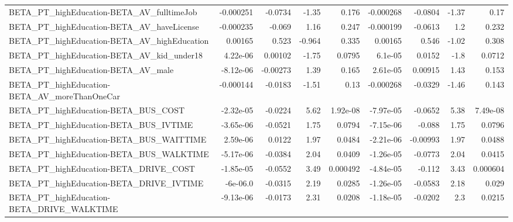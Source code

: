 \begin{tabular}{lrrrrrrrr}
BETA\_PT\_highEducation-BETA\_AV\_fulltimeJob          &   -0.000251 &      -0.0734 &     -1.35 &    0.176 &  -0.000268 &     -0.0804 &        -1.37 &          0.17 \\
BETA\_PT\_highEducation-BETA\_AV\_haveLicense          &   -0.000235 &       -0.069 &      1.16 &    0.247 &  -0.000199 &     -0.0613 &          1.2 &         0.232 \\
BETA\_PT\_highEducation-BETA\_AV\_highEducation        &     0.00165 &        0.523 &    -0.964 &    0.335 &    0.00165 &       0.546 &        -1.02 &         0.308 \\
BETA\_PT\_highEducation-BETA\_AV\_kid\_under18          &    4.22e-06 &      0.00102 &     -1.75 &   0.0795 &    6.1e-05 &      0.0152 &         -1.8 &        0.0712 \\
BETA\_PT\_highEducation-BETA\_AV\_male                 &   -8.12e-06 &     -0.00273 &      1.39 &    0.165 &   2.61e-05 &     0.00915 &         1.43 &         0.153 \\
BETA\_PT\_highEducation-BETA\_AV\_moreThanOneCar       &   -0.000144 &      -0.0183 &     -1.51 &     0.13 &  -0.000268 &     -0.0329 &        -1.46 &         0.143 \\
BETA\_PT\_highEducation-BETA\_BUS\_COST                &   -2.32e-05 &      -0.0224 &      5.62 & 1.92e-08 &  -7.97e-05 &     -0.0652 &         5.38 &      7.49e-08 \\
BETA\_PT\_highEducation-BETA\_BUS\_IVTIME              &   -3.65e-06 &      -0.0521 &      1.75 &   0.0794 &  -7.15e-06 &      -0.088 &         1.75 &        0.0796 \\
BETA\_PT\_highEducation-BETA\_BUS\_WAITTIME            &    2.59e-06 &       0.0122 &      1.97 &   0.0484 &  -2.21e-06 &    -0.00993 &         1.97 &        0.0488 \\
BETA\_PT\_highEducation-BETA\_BUS\_WALKTIME            &   -5.17e-06 &      -0.0384 &      2.04 &   0.0409 &  -1.26e-05 &     -0.0773 &         2.04 &        0.0415 \\
BETA\_PT\_highEducation-BETA\_DRIVE\_COST              &   -1.85e-05 &      -0.0552 &      3.49 & 0.000492 &  -4.84e-05 &      -0.112 &         3.43 &      0.000604 \\
BETA\_PT\_highEducation-BETA\_DRIVE\_IVTIME            &    -6e-06.0 &      -0.0315 &      2.19 &   0.0285 &  -1.26e-05 &     -0.0583 &         2.18 &         0.029 \\
BETA\_PT\_highEducation-BETA\_DRIVE\_WALKTIME          &   -9.13e-06 &      -0.0173 &      2.31 &   0.0208 &  -1.18e-05 &     -0.0202 &          2.3 &        0.0215 \\

\end{tabular}
